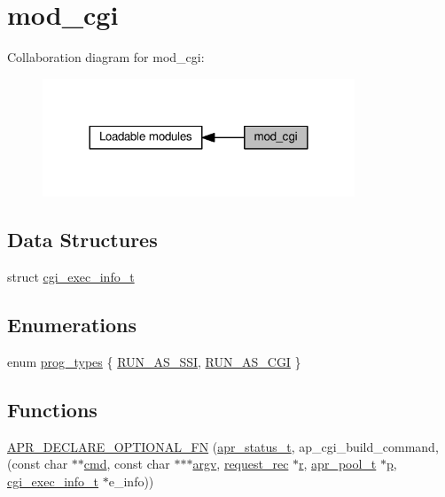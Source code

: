 \hypertarget{group__MOD__CGI}{}\section{mod\+\_\+cgi}
\label{group__MOD__CGI}
Collaboration diagram for mod\+\_\+cgi\+:
\nopagebreak
\begin{figure}[H]
\begin{center}
\leavevmode
\includegraphics[width=264pt]{group__MOD__CGI}
\end{center}
\end{figure}
\subsection*{Data Structures}
\begin{DoxyCompactItemize}
\item 
struct \hyperlink{structcgi__exec__info__t}{cgi\+\_\+exec\+\_\+info\+\_\+t}
\end{DoxyCompactItemize}
\subsection*{Enumerations}
\begin{DoxyCompactItemize}
\item 
enum \hyperlink{group__MOD__CGI_ga2aed76296e964d764add7a7c6d42fb86}{prog\+\_\+types} \{ \hyperlink{group__MOD__CGI_gga2aed76296e964d764add7a7c6d42fb86a515ea281133def435410f60ef29cb64f}{R\+U\+N\+\_\+\+A\+S\+\_\+\+S\+SI}, 
\hyperlink{group__MOD__CGI_gga2aed76296e964d764add7a7c6d42fb86a74ae7b67bc50473167ddd0fe702806a0}{R\+U\+N\+\_\+\+A\+S\+\_\+\+C\+GI}
 \}
\end{DoxyCompactItemize}
\subsection*{Functions}
\begin{DoxyCompactItemize}
\item 
\hyperlink{group__MOD__CGI_ga2fc4c48412aba176f198e1ca44993672}{A\+P\+R\+\_\+\+D\+E\+C\+L\+A\+R\+E\+\_\+\+O\+P\+T\+I\+O\+N\+A\+L\+\_\+\+FN} (\hyperlink{group__apr__errno_gaa5105fa83cc322f09382292db8b47593}{apr\+\_\+status\+\_\+t}, ap\+\_\+cgi\+\_\+build\+\_\+command,(const char $\ast$$\ast$\hyperlink{group__apr__thread__proc_ga7b715f5a87a71c6766684c1798251237}{cmd}, const char $\ast$$\ast$$\ast$\hyperlink{group__apr__getopt_ga675a108e956f4e2ea74dae8d26e6273e}{argv}, \hyperlink{structrequest__rec}{request\+\_\+rec} $\ast$\hyperlink{pcregrep_8txt_a2e9e9438b26c0bb4425367a7e4f75eb3}{r}, \hyperlink{structapr__pool__t}{apr\+\_\+pool\+\_\+t} $\ast$\hyperlink{group__APACHE__CORE__MPM_ga5cd91701e5c167f2b1a38e70ab57817e}{p}, \hyperlink{structcgi__exec__info__t}{cgi\+\_\+exec\+\_\+info\+\_\+t} $\ast$e\+\_\+info))
\end{DoxyCompactItemize}


